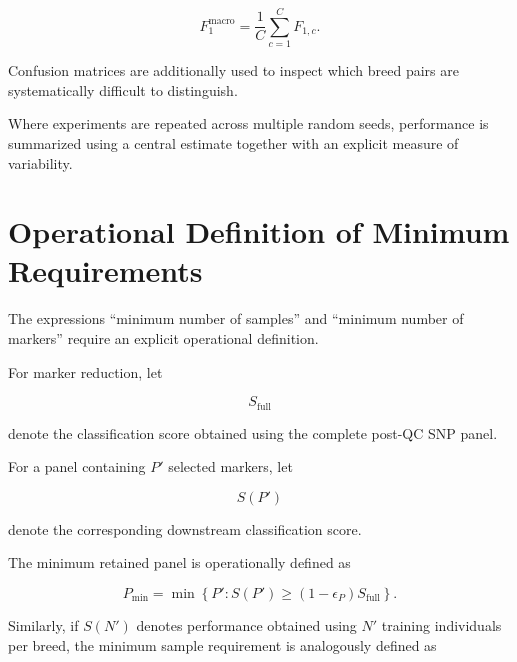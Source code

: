 \begin{equation}
    F_{1}^{\mathrm{macro}}
    =
    \frac{1}{C}
    \sum_{c=1}^{C}
    F_{1,c}.
    \label{eq:macro_f1}
\end{equation}

Confusion matrices are additionally used to inspect which breed
pairs are systematically difficult to distinguish.

Where experiments are repeated across multiple random seeds,
performance is summarized using a central estimate together with an
explicit measure of variability.



\section{Operational Definition of Minimum Requirements}
\label{sec:minimum_requirements}

The expressions ``minimum number of samples'' and ``minimum number
of markers'' require an explicit operational definition.

For marker reduction, let

\begin{equation}
    S_{\mathrm{full}}
\end{equation}

denote the classification score obtained using the complete
post-QC SNP panel.

For a panel containing $P'$ selected markers, let

\begin{equation}
    S(P')
\end{equation}

denote the corresponding downstream classification score.

The minimum retained panel is operationally defined as

\begin{equation}
    P_{\min}
    =
    \min
    \left\{
        P'
        :
        S(P')
        \geq
        (1-\epsilon_P)
        S_{\mathrm{full}}
    \right\}.
    \label{eq:minimum_marker_definition}
\end{equation}

Similarly, if $S(N')$ denotes performance obtained using $N'$
training individuals per breed, the minimum sample requirement is analogously defined as

